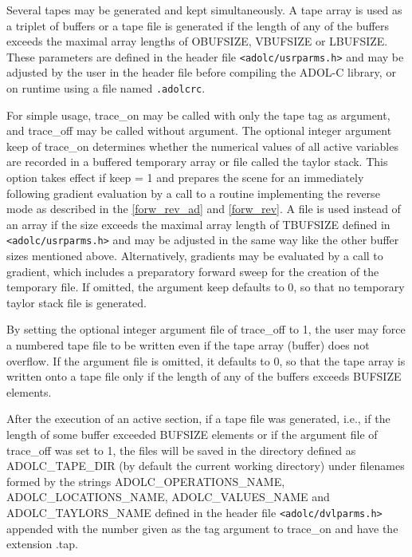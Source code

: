 \documentclass[11pt,twoside]{article}
\begin{document}
Several tapes may be generated and kept simultaneously.
A tape array is used as a triplet of buffers or a tape file is generated if
the length of any of the buffers exceeds the maximal array lengths of 
{\sf OBUFSIZE}, {\sf VBUFSIZE} or {\sf LBUFSIZE}. These parameters are
defined in the header file \verb=<adolc/usrparms.h>=
and may be adjusted by the user in the header file before compiling
the ADOL-C library, or on runtime using a file named \verb=.adolcrc=. 

For simple usage, {\sf trace\_on} may be called with only the tape
{\sf tag} as argument, and {\sf trace\_off} may be called 
without argument. The optional integer argument {\sf keep} of 
{\sf trace\_on} determines whether the numerical values of all
active variables are recorded in a buffered temporary array or file
called the taylor stack. 
This option takes effect if
{\sf keep} = 1 and prepares the scene for an immediately following
gradient evaluation by a call to a routine implementing the reverse mode
as described in the \autoref{forw_rev_ad} and \autoref{forw_rev}. A
file is used instead of an array if the size exceeds the maximal array
length of {\sf TBUFSIZE} defined in \verb=<adolc/usrparms.h>= and may
be adjusted in the same way like the other buffer sizes mentioned above.
Alternatively, gradients may be evaluated by a call
to {\sf gradient}, which includes a preparatory forward sweep
for the creation of the temporary file. If omitted, the argument 
{\sf  keep} defaults to 0, so that no temporary
taylor stack file is generated. 

By setting the optional integer argument {\sf file} of 
{\sf  trace\_off} to 1, the user may force a numbered  tape
file to be written even if the tape array (buffer) does not overflow.
If the argument {\sf file} is omitted, it 
defaults to 0, so that the tape array is written onto a tape file only 
if the length of any of the buffers exceeds {\sf [OLVT]BUFSIZE} elements.

After the execution of an active section, if a tape file was generated, i.e.,
if the length of some buffer exceeded {\sf [OLVT]BUFSIZE} elements or if the 
argument {\sf file} of {\sf trace\_off} was set to 1, the files will be
saved in the directory defined as {\sf ADOLC\_TAPE\_DIR} (by default
the current working directory) under filenames formed by 
the strings {\sf ADOLC\_OPERATIONS\_NAME}, {\sf
  ADOLC\_LOCATIONS\_NAME}, {\sf ADOLC\_VALUES\_NAME} and {\sf
  ADOLC\_TAYLORS\_NAME} defined in
the header file \verb=<adolc/dvlparms.h>= appended with the number
given as the {\sf tag} argument to {\sf trace\_on} and have the
extension {\sf .tap}.
\end{document}
